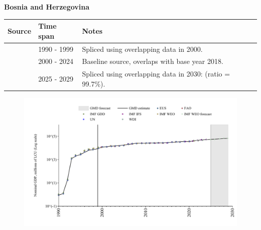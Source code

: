 \documentclass[12pt,a4paper,landscape]{article}
\begin{document}
\begin{adjustbox}{max totalsize={\paperwidth}{\paperheight},center}
\begin{minipage}[t][\textheight][t]{\textwidth}
\vspace*{0.5cm}
{}
\begin{center}
{\Large\bfseries Bosnia and Herzegovina}
\end{center}
\vspace{0.5cm}
\begin{table}[H]
\centering
\small
\begin{tabular}{|l|l|l|}
\hline
\textbf{Source} & \textbf{Time span} & \textbf{Notes} \\
\hline
\rowcolor{white}\cite{WDI}& 1990 - 1999 &Spliced using overlapping data in 2000.\\
\rowcolor{lightgray}\cite{EUS}& 2000 - 2024 &Baseline source, overlaps with base year 2018.\\
\rowcolor{white}\cite{IMF_WEO_forecast}& 2025 - 2029 &Spliced using overlapping data in 2030: (ratio = 99.7\%).\\
\hline
\end{tabular}
\end{table}
\begin{figure}[H]
\centering
\includegraphics[width=\textwidth,height=0.6\textheight,keepaspectratio]{graphs/BIH_nGDP.pdf}
\end{figure}
\end{minipage}
\end{adjustbox}
\end{document}
